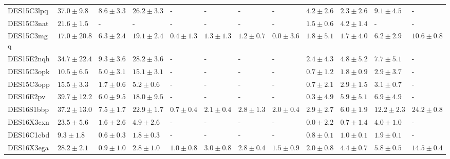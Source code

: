 \documentclass[fleqn,usenatbib,]{mnras}
\begin{document}
\begin{table}
\begin{tabular}{llllllllllll}
DES15C3lpq &   $37.0 \pm 9.8$ &    $8.6 \pm 3.3$ &    $26.2 \pm 3.3$ &               - &               - &               - &               - &   $4.2 \pm 2.6$ &    $2.3 \pm 2.6$ &    $9.1 \pm 4.5$ &                - \\
DES15C3nat &   $21.6 \pm 1.5$ &                - &                 - &               - &               - &               - &               - &   $1.5 \pm 0.6$ &    $4.2 \pm 1.4$ &                - &                - \\
DES15C3mgq &  $17.0 \pm 20.8$ &    $6.3 \pm 2.4$ &    $19.1 \pm 2.4$ &   $0.4 \pm 1.3$ &   $1.3 \pm 1.3$ &   $1.2 \pm 0.7$ &   $0.0 \pm 3.6$ &   $1.8 \pm 5.1$ &    $1.7 \pm 4.0$ &    $6.2 \pm 2.9$ &   $10.6 \pm 0.8$ \\
DES15E2nqh &  $34.7 \pm 22.4$ &    $9.3 \pm 3.6$ &    $28.2 \pm 3.6$ &               - &               - &               - &               - &   $2.4 \pm 4.3$ &    $4.8 \pm 5.2$ &    $7.7 \pm 5.1$ &                - \\
DES15C3opk &   $10.5 \pm 6.5$ &    $5.0 \pm 3.1$ &    $15.1 \pm 3.1$ &               - &               - &               - &               - &   $0.7 \pm 1.2$ &    $1.8 \pm 0.9$ &    $2.9 \pm 3.7$ &                - \\
DES15C3opp &   $15.5 \pm 3.3$ &    $1.7 \pm 0.6$ &     $5.2 \pm 0.6$ &               - &               - &               - &               - &   $0.7 \pm 2.1$ &    $2.9 \pm 1.5$ &    $3.1 \pm 0.7$ &                - \\
DES16E2pv  &  $39.7 \pm 12.2$ &    $6.0 \pm 9.5$ &    $18.0 \pm 9.5$ &               - &               - &               - &               - &   $0.3 \pm 4.9$ &    $5.9 \pm 5.1$ &    $6.9 \pm 4.9$ &                - \\
DES16S1bbp &  $37.2 \pm 13.0$ &    $7.5 \pm 1.7$ &    $22.9 \pm 1.7$ &   $0.7 \pm 0.4$ &   $2.1 \pm 0.4$ &   $2.8 \pm 1.3$ &   $2.0 \pm 0.4$ &   $2.9 \pm 2.7$ &    $6.0 \pm 1.9$ &   $12.2 \pm 2.3$ &   $24.2 \pm 0.8$ \\
DES16X3cxn &   $23.5 \pm 5.6$ &    $1.6 \pm 2.6$ &     $4.9 \pm 2.6$ &               - &               - &               - &               - &   $0.0 \pm 2.2$ &    $0.7 \pm 1.4$ &    $4.0 \pm 1.0$ &                - \\
DES16C1cbd &    $9.3 \pm 1.8$ &    $0.6 \pm 0.3$ &     $1.8 \pm 0.3$ &               - &               - &               - &               - &   $0.8 \pm 0.1$ &    $1.0 \pm 0.1$ &    $1.9 \pm 0.1$ &                - \\
DES16X3ega &   $28.2 \pm 2.1$ &    $0.9 \pm 1.0$ &     $2.8 \pm 1.0$ &   $1.0 \pm 0.8$ &   $3.0 \pm 0.8$ &   $2.8 \pm 0.4$ &   $1.5 \pm 0.9$ &   $2.0 \pm 0.8$ &    $4.4 \pm 0.7$ &    $5.8 \pm 0.5$ &   $14.5 \pm 0.4$ \\

\end{tabular}
\end{table}
\end{document}
